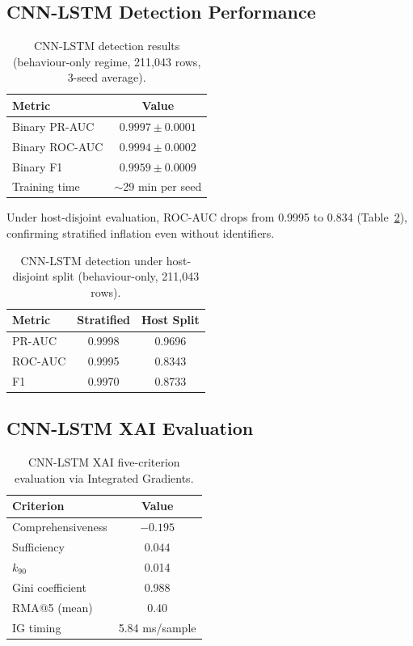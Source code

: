 \documentclass[12pt,a4paper]{report}
\begin{document}
\subsection{CNN-LSTM Detection Performance}
\label{sec:cnnlstm-detection}

\begin{table}[H]
\centering
\caption{CNN-LSTM detection results (behaviour-only regime, 211,043 rows, 3-seed average).}
\label{tab:cnnlstm}
\begin{tabular}{lc}
\toprule
\textbf{Metric} & \textbf{Value} \\
\midrule
Binary PR-AUC & $0.9997 \pm 0.0001$ \\
Binary ROC-AUC & $0.9994 \pm 0.0002$ \\
Binary F1 & $0.9959 \pm 0.0009$ \\
Training time & $\sim$29 min per seed \\
\bottomrule
\end{tabular}
\end{table}

Under host-disjoint evaluation, ROC-AUC drops from 0.9995 to 0.834 (Table~\ref{tab:cnnlstm-host}), confirming stratified inflation even without identifiers.

\begin{table}[H]
\centering
\caption{CNN-LSTM detection under host-disjoint split (behaviour-only, 211,043 rows).}
\label{tab:cnnlstm-host}
\begin{tabular}{lcc}
\toprule
\textbf{Metric} & \textbf{Stratified} & \textbf{Host Split} \\
\midrule
PR-AUC & 0.9998 & 0.9696 \\
ROC-AUC & 0.9995 & 0.8343 \\
F1 & 0.9970 & 0.8733 \\
\bottomrule
\end{tabular}
\end{table}

\subsection{CNN-LSTM XAI Evaluation}
\label{sec:cnnlstm-xai}

\begin{table}[H]
\centering
\caption{CNN-LSTM XAI five-criterion evaluation via Integrated Gradients.}
\label{tab:cnnlstm-xai}
\begin{tabular}{lc}
\toprule
\textbf{Criterion} & \textbf{Value} \\
\midrule
Comprehensiveness & $-0.195$ \\
Sufficiency & $0.044$ \\
$k_{90}$ & 0.014 \\
Gini coefficient & 0.988 \\
RMA@5 (mean) & 0.40 \\
IG timing & 5.84 ms/sample \\
\bottomrule
\end{tabular}
\end{table}
\end{document}
